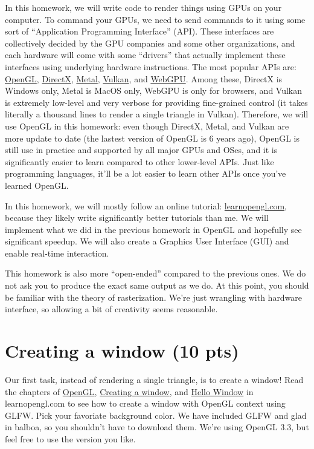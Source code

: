 In this homework, we will write code to render things using GPUs on your computer. To command your GPUs, we need to send commands to it using some sort of ``Application Programming Interface'' (API). These interfaces are collectively decided by the GPU companies and some other organizations, and each hardware will come with some ``drivers'' that actually implement these interfaces using underlying hardware instructions. The most popular APIs are: \href{https://en.wikipedia.org/wiki/OpenGL}{OpenGL}, \href{https://en.wikipedia.org/wiki/DirectX}{DirectX}, \href{https://en.wikipedia.org/wiki/Metal_(API)}{Metal}, \href{https://en.wikipedia.org/wiki/Vulkan}{Vulkan}, and \href{https://en.wikipedia.org/wiki/WebGPU}{WebGPU}. Among these, DirectX is Windows only, Metal is MacOS only, WebGPU is only for browsers, and Vulkan is extremely low-level and very verbose for providing fine-grained control (it takes literally a thousand lines to render a single triangle in Vulkan). Therefore, we will use OpenGL in this homework: even though DirectX, Metal, and Vulkan are more update to date (the lastest version of OpenGL is 6 years ago), OpenGL is still use in practice and supported by all major GPUs and OSes, and it is significantly easier to learn compared to other lower-level APIs. Just like programming languages, it'll be a lot easier to learn other APIs once you've learned OpenGL.

In this homework, we will mostly follow an online tutorial: \href{https://learnopengl.com/}{learnopengl.com}, because they likely write significantly better tutorials than me. We will implement what we did in the previous homework in OpenGL and hopefully see significant speedup. We will also create a Graphics User Interface (GUI) and enable real-time interaction.

This homework is also more ``open-ended'' compared to the previous ones. We do not ask you to produce the exact same output as we do. At this point, you should be familiar with the theory of rasterization. We're just wrangling with hardware interface, so allowing a bit of creativity seems reasonable.

\section{Creating a window (10 pts)}

Our first task, instead of rendering a single triangle, is to create a window! Read the chapters of \href{https://learnopengl.com/Getting-started/OpenGL}{OpenGL}, \href{https://learnopengl.com/Getting-started/Creating-a-window}{Creating a window}, and \href{https://learnopengl.com/Getting-started/Hello-Window}{Hello Window} in learnopengl.com to see how to create a window with OpenGL context using GLFW. Pick your favoriate background color. We have included GLFW and glad in balboa, so you shouldn't have to download them. We're using OpenGL 3.3, but feel free to use the version you like.

